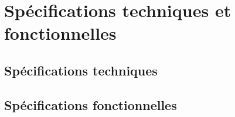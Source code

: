 \chapter{Spécifications techniques et fonctionnelles}

    \section{Spécifications techniques}

    \section{Spécifications fonctionnelles}
